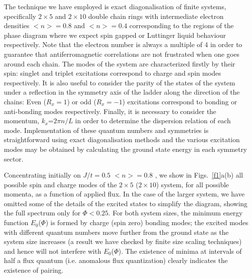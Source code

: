 {The technique we have employed is exact diagonalisation of finite systems,
specifically
$2\times 5$ and $2\times 10$  double chain  rings with intermediate electron
densities
$\big <n\big >=0.8$ and
$\big <n\big >=0.4$ corresponding to the regions of the phase diagram   where
we expect spin gapped or Luttinger liquid behaviour respectively.
 Note that the electron number is always a multiple of 4 in order to
guarantee that antiferromagnetic correlations are not frustrated when one goes
around each chain.
The modes of the system are characterized firstly  by their spin: singlet and
triplet excitations correspond to charge and spin modes respectively.
It is also useful to consider the parity of the states of the system under a
reflection in the symmetry axis
of the ladder along the
direction of the chains: Even ($R_x=1$) or odd ($R_x=-1$) excitations
correspond to bonding or anti-bonding modes respectively.
Finally, it is necessary to consider the momentum, $k_x$=$2\pi n/L$ in order to
determine the dispersion relation of each mode.
Implementation of these  quantum numbers and symmetries is straightforward
using exact diagonalisation methods and  the various excitation modes
may be   obtained by calculating the ground state energy in each symmetry
sector.

Concentrating initially on $J$/$t$$=0.5$ $\big <n\big >=0.8$ ,
we show in Figs.\ \ref{f1}a(b)
  all possible spin and charge modes of the $2\times 5$ ($2\times 10$) system,
  for all possible
momenta,
as a function of applied flux.
In  the case of the larger system,
we have omitted some of the details of the excited states to
simplify the diagram, showing the full spectrum only for
 $\Phi < 0.25$.
For both system sizes, the minimum energy function $E_0$($\Phi$)
is formed by charge (spin zero) bonding modes;
the excited modes with different quantum
numbers  move further from the ground state as the system size increases (a
result we have checked by finite size scaling techniques) and
hence will not interfere with  $E_0$($\Phi$).
The existence of minima at intervals of half a flux quantum (i.e.
anomalous flux quantization) clearly
indicates the existence of pairing.

}
